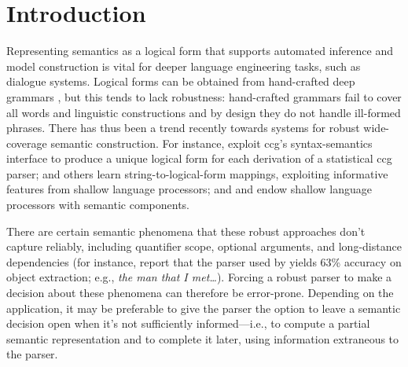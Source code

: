 \section{Introduction} \label{sec:intro}

Representing semantics as a logical form that supports automated
inference and model construction is vital for deeper language
engineering tasks, such as dialogue systems.  Logical forms
can be obtained from hand-crafted deep grammars
\cite{butt:etal:1999,copestake:flickinger:2000}, but this
tends to lack robustness: hand-crafted grammars fail to cover all
words and linguistic constructions and by design they do not handle
ill-formed phrases. 
There has thus been a trend recently towards systems for
robust wide-coverage semantic construction.  For instance,
 exploit {\sc ccg}'s syntax-semantics
interface to produce a unique logical form for each derivation of a
statistical {\sc ccg} parser;  and
others learn string-to-logical-form mappings, exploiting informative
features from shallow language processors; and
 and  endow shallow
language processors with semantic components.

% 

There are certain semantic phenomena that these robust
approaches don't capture reliably, including quantifier scope,
optional arguments, and long-distance dependencies (for instance,
 report that the parser used by
 yields 63\% accuracy on object
extraction; e.g., {\em the man that I met\dots}).  Forcing a robust
parser to make a decision about these phenomena can therefore be
error-prone.  Depending on the application, it may be preferable to
give the parser the option to leave a semantic decision open when it's not
sufficiently informed---i.e., to compute a partial semantic
representation and to complete it later, using information
extraneous to the parser.

